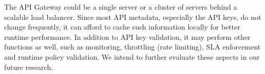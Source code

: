 The API Gateway could be a single server or a cluster of servers behind a scalable load balancer. Since most API metadata, especially the API keys, do not change
frequently, it can afford to cache such information locally for better runtime performance. In addition to API key validation, it may perform other
functions as well, such as monitoring, throttling (rate limiting), SLA enforcement and runtime policy validation. We intend to further evaluate these aspects
in our future research.